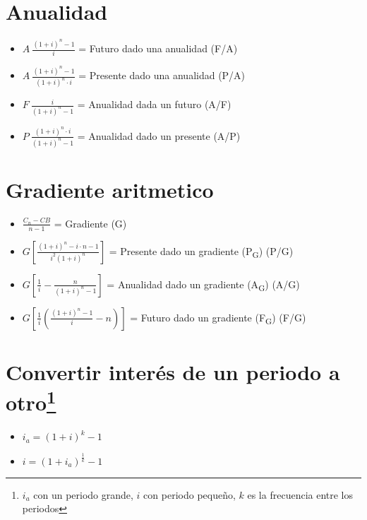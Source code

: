 \documentclass[11pt]{article}
\begin{document}
\section*{Anualidad}
\label{sec:org6c0f422}
\begin{itemize}
\item \(A~\frac{(1+i)^n-1}{i}\) = Futuro dado una anualidad (F/A)
\item \(A~\frac{(1+i)^n-1}{(1+i)^n\cdot i}\) = Presente dado una anualidad (P/A)
\item \(F~\frac{i}{(1+i)^n-1}\) = Anualidad dada un futuro (A/F)
\item \(P~\frac{(1+i)^n\cdot i}{(1+i)^n-1}\) = Anualidad dado un presente (A/P)
\end{itemize}

\section*{Gradiente aritmetico}
\label{sec:orgd0404ac}
\begin{itemize}
\item \(\frac{C_n - CB}{n-1}\) = Gradiente (G)
\item \(G\left[\frac{(1+i)^n-i\cdot n-1}{i^2(1+i)^n}\right]\) = Presente dado un gradiente (P\textsubscript{G}) (P/G)
\item \(G\left[\frac{1}{i}-\frac{n}{(1+i)^n-1}\right]\) = Anualidad dado un gradiente (A\textsubscript{G}) (A/G)
\item \(G\left[ \frac{1}{i} \left( \frac{(1+i)^n-1}{i} - n \right) \right]\) = Futuro dado un gradiente (F\textsubscript{G}) (F/G)
\end{itemize}

\section*{Convertir interés de un periodo a otro\footnote{\(i_a\) con un periodo grande, \(i\) con periodo pequeño, \(k\) es la frecuencia entre los periodos}}
\label{sec:org9b3a25f}
\begin{itemize}
\item \(i_a = (1+i)^k - 1\)
\item \(i=(1+i_a)^{\frac{1}{k}}-1\)
\end{itemize}
\end{document}
